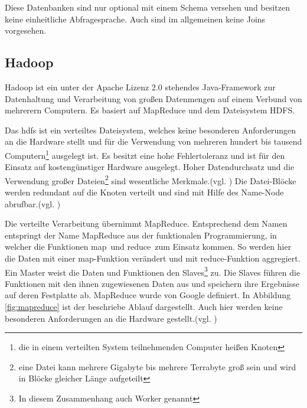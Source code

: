 Diese Datenbanken sind nur optional mit einem Schema versehen und besitzen keine einheitliche Abfragesprache.
Auch sind im allgemeinen keine Joins vorgesehen.


\subsection{Hadoop}
\label{hadoop}

Hadoop ist ein unter der Apache Lizenz 2.0 stehendes Java-Framework zur Datenhaltung und Verarbeitung von großen Datenmengen auf einem Verbund von mehrerern Computern.
Es basiert auf MapReduce und dem Dateisystem HDFS.

Das \Gls{hdfs} ist ein verteiltes Dateisystem, welches keine besonderen Anforderungen an die Hardware stellt und für die Verwendung von mehreren hundert bis tausend Computern\footnote{die in einem verteilten System teilnehmenden Computer heißen Knoten} ausgelegt ist.
Es besitzt eine hohe Fehlertoleranz und ist für den Einsatz auf kostengünstiger Hardware ausgelegt.
Hoher Datendurchsatz und die Verwendung großer Dateien\footnote{eine Datei kann mehrere Gigabyte bis mehrere Terrabyte groß sein und wird in Blöcke gleicher Länge aufgeteilt} sind wesentliche Merkmale.(vgl. \cite[S.3]{paper:hadoop})
Die Datei-Blöcke werden redundant auf die Knoten verteilt und sind mit Hilfe des Name-Node abrufbar.(vgl. \cite[S.7]{ba:dan})

Die verteilte Verarbeitung übernimmt MapReduce.
Entsprechend dem Namen entspringt der Name MapReduce aus der funktionalen Programmierung, in welcher die Funktionen \glqq map\grqq \ und \glqq reduce\grqq \ zum Einsatz kommen.
So werden hier die Daten mit einer map-Funktion verändert und mit reduce-Funktion aggregiert.
Ein Master weist die Daten und Funktionen den Slaves\footnote{In diesem Zusammenhang auch Worker genannt} zu.
Die Slaves führen die Funktionen mit den ihnen zugewiesenen Daten aus und speichern ihre Ergebnisse auf deren Festplatte ab.
MapReduce wurde von Google definiert.
In Abbildung \ref{fig:mapreduce} ist der beschriebe Ablauf dargestellt.
Auch hier werden keine besonderen Anforderungen an die Hardware gestellt.(vgl. \cite[S.3]{paper:mapreduce})

